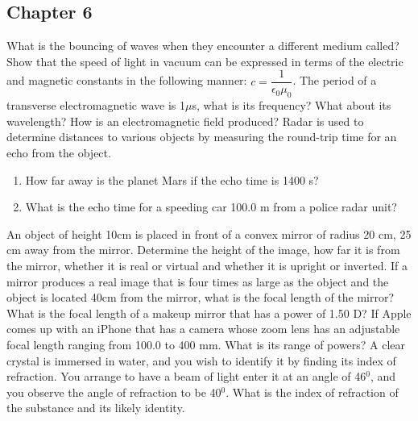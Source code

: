 \documentclass[12pt,addpoints]{exam}
\begin{document}
\begin{questions}
		\subsection*{Chapter 6}
		\question What is the bouncing of waves when they encounter a different medium called?\vspace{1.5in} 
		\question Show that the speed of light in vacuum can be expressed in terms of the electric and magnetic constants in the following manner: $c=\dfrac{1}{\epsilon_0\mu_0}$.\vspace{1.5in}
		\question The period of a transverse electromagnetic wave is 1$\mu$s, what is its frequency? What about its wavelength?\vspace{1.5in}
		\question How is an electromagnetic field produced?\vspace{1.5in}
		\question Radar is used to determine distances to various objects by measuring the round-trip time for an echo from the object.
		\begin{enumerate}[label=(\roman*)]
			\item How far away is the planet Mars if the echo time is 1400 s?\vspace{1.5in}
			\item What is the echo time for a speeding car 100.0 m from a police radar unit?\vspace{1.5in}
		\end{enumerate}
		\question An object of height 10cm is placed in front of a convex mirror of radius 20 cm,  25 cm away from the mirror. Determine the height of the image, how far it is from the mirror, whether it is real or virtual and whether it is upright or inverted.\vspace{1.5in}
		\question If a mirror produces a real image that is four times as large as the object and the object is located 40cm from the mirror, what is the focal length of the mirror?\vspace{1.5in}
		\question What is the focal length of a makeup mirror that has a power of 1.50 D?\vspace{1in}
		\question If Apple comes up with an iPhone that has a camera whose zoom lens has an adjustable focal length ranging from 100.0 to 400 mm. What is its range of powers?\vspace{1in}
		\question A clear crystal is immersed in water, and you wish to identify it by finding its index of refraction. You arrange to have a beam of light enter it at an angle of 46$^0$, and you observe the angle of refraction to be 40$^0$. What is the index of refraction of the substance and its likely identity.\vspace{1.5in}	
	\end{questions}		
\end{document}

